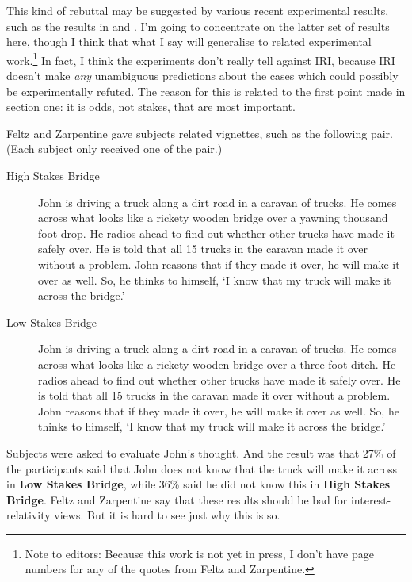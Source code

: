 \documentclass[11pt,oneside]{book}
\begin{document}
This kind of rebuttal may be suggested by various recent experimental results, such as the results in \cite{May2010} and \cite{FeltzZarpentine2010}. I'm going to concentrate on the latter set of results here, though I think that what I say will generalise to related experimental work.\footnote{Note to editors: Because this work is not yet in press, I don't have page numbers for any of the quotes from Feltz and Zarpentine.} In fact, I think the experiments don't really tell against IRI, because IRI doesn't make \textit{any} unambiguous predictions about the cases which could possibly be experimentally refuted. The reason for this is related to the first point made in section one: it is odds, not stakes, that are most important.

Feltz and Zarpentine gave subjects related vignettes, such as the following pair. (Each subject only received one of the pair.)

\begin{description}
\item[High Stakes Bridge] John is driving a truck along a dirt road in a caravan of trucks. He comes across what looks like a rickety wooden bridge over a yawning thousand foot drop. He radios ahead to find out whether other trucks have made it safely over. He is told that all 15 trucks in the caravan made it over without a problem. John reasons that if they made it over, he will make it over as well. So, he thinks to himself, `I know that my truck will make it across the bridge.'

\item[Low Stakes Bridge] John is driving a truck along a dirt road in a caravan of trucks. He comes across what looks like a rickety wooden bridge over a three foot ditch. He radios ahead to find out whether other trucks have made it safely over. He is told that all 15 trucks in the caravan made it over without a problem. John reasons that if they made it over, he will make it over as well. So, he thinks to himself, `I know that my truck will make it across the bridge.' \citep[??]{FeltzZarpentine2010}
\end{description}

\noindent Subjects were asked to evaluate John's thought. And the result was that 27\% of the participants said that John does not know that the truck will make it across in \textbf{Low Stakes Bridge}, while 36\% said he did not know this in \textbf{High Stakes Bridge}. Feltz and Zarpentine say that these results should be bad for interest-relativity views. But it is hard to see just why this is so.
\end{document}
